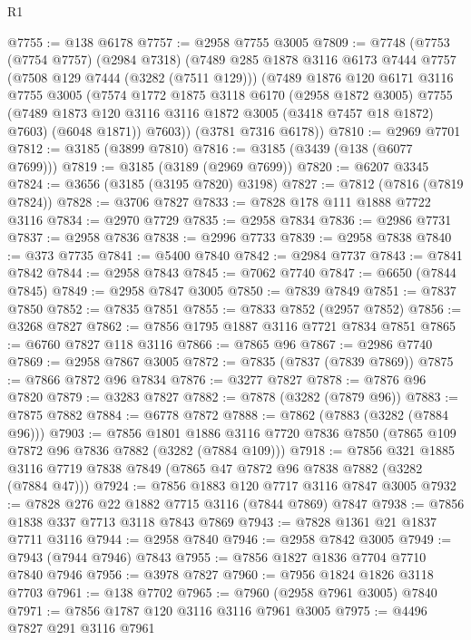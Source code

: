 \begin{lexlean}{R1}
\begin{coremodule}
@7755 := @138 @6178
@7757 := @2958 @7755 @3005
@7809 := @7748
    (@7753
      (@7754 @7757)
      (@2984 @7318)
      (@7489
        @285
        @1878
        @3116
        @6173
        @7444
        @7757
        (@7508 @129 @7444 (@3282 (@7511 @129)))
        (@7489
          @1876
          @120
          @6171
          @3116
          @7755
          @3005
          (@7574
            @1772
            @1875
            @3118
            @6170
            (@2958 @1872 @3005)
            @7755
            (@7489 @1873 @120 @3116 @3116 @1872 @3005 (@3418 @7457 @18 @1872) @7603)
            (@6048 @1871))
          @7603))
      (@3781 @7316 @6178))
@7810 := @2969 @7701
@7812 := @3185 (@3899 @7810)
@7816 := @3185 (@3439 (@138 (@6077 @7699)))
@7819 := @3185 (@3189 (@2969 @7699))
@7820 := @6207 @3345
@7824 := @3656 (@3185 (@3195 @7820) @3198)
@7827 := @7812 (@7816 (@7819 @7824))
@7828 := @3706 @7827
@7833 := @7828 @178 @111 @1888 @7722 @3116
@7834 := @2970 @7729
@7835 := @2958 @7834
@7836 := @2986 @7731
@7837 := @2958 @7836
@7838 := @2996 @7733
@7839 := @2958 @7838
@7840 := @373 @7735
@7841 := @5400 @7840
@7842 := @2984 @7737
@7843 := @7841 @7842
@7844 := @2958 @7843
@7845 := @7062 @7740
@7847 := @6650 (@7844 @7845)
@7849 := @2958 @7847 @3005
@7850 := @7839 @7849
@7851 := @7837 @7850
@7852 := @7835 @7851
@7855 := @7833 @7852 (@2957 @7852)
@7856 := @3268 @7827
@7862 := @7856 @1795 @1887 @3116 @7721 @7834 @7851
@7865 := @6760 @7827 @118 @3116
@7866 := @7865 @96
@7867 := @2986 @7740
@7869 := @2958 @7867 @3005
@7872 := @7835 (@7837 (@7839 @7869))
@7875 := @7866 @7872 @96 @7834
@7876 := @3277 @7827
@7878 := @7876 @96 @7820
@7879 := @3283 @7827
@7882 := @7878 (@3282 (@7879 @96))
@7883 := @7875 @7882
@7884 := @6778 @7872
@7888 := @7862 (@7883 (@3282 (@7884 @96)))
@7903 := @7856
    @1801
    @1886
    @3116
    @7720
    @7836
    @7850
    (@7865 @109 @7872 @96 @7836 @7882 (@3282 (@7884 @109)))
@7918 := @7856
    @321
    @1885
    @3116
    @7719
    @7838
    @7849
    (@7865 @47 @7872 @96 @7838 @7882 (@3282 (@7884 @47)))
@7924 := @7856 @1883 @120 @7717 @3116 @7847 @3005
@7932 := @7828 @276 @22 @1882 @7715 @3116 (@7844 @7869) @7847
@7938 := @7856 @1838 @337 @7713 @3118 @7843 @7869
@7943 := @7828 @1361 @21 @1837 @7711 @3116
@7944 := @2958 @7840
@7946 := @2958 @7842 @3005
@7949 := @7943 (@7944 @7946) @7843
@7955 := @7856 @1827 @1836 @7704 @7710 @7840 @7946
@7956 := @3978 @7827
@7960 := @7956 @1824 @1826 @3118 @7703
@7961 := @138 @7702
@7965 := @7960 (@2958 @7961 @3005) @7840
@7971 := @7856 @1787 @120 @3116 @3116 @7961 @3005
@7975 := @4496 @7827 @291 @3116 @7961

\end{coremodule}
\end{lexlean}

